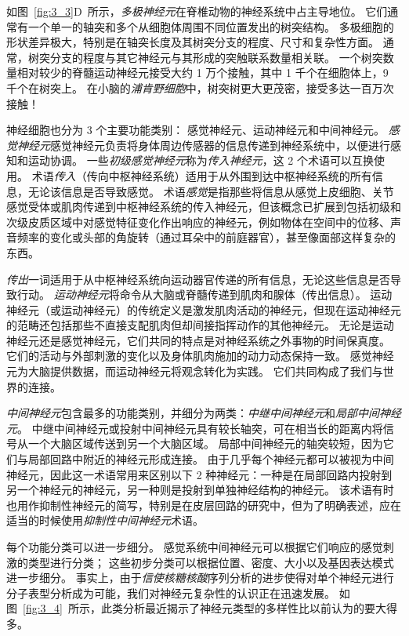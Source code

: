 如图~\ref{fig:3_3}D~所示，\textit{多极神经元}在脊椎动物的神经系统中占主导地位。 
它们通常有一个单一的轴突和多个从细胞体周围不同位置发出的树突结构。
多极细胞的形状差异极大，特别是在轴突长度及其树突分支的程度、尺寸和复杂性方面。 
通常，树突分支的程度与其它神经元与其形成的突触联系数量相关联。 
一个树突数量相对较少的脊髓运动神经元接受大约 1 万个接触，其中 1 千个在细胞体上，9 千个在树突上。
在小脑的\textit{浦肯野细胞}中，树突树更大更茂密，接受多达一百万次接触！


神经细胞也分为 3 个主要功能类别：
感觉神经元、运动神经元和中间神经元。 
\textit{感觉神经元}感觉神经元负责将身体周边传感器的信息传递到神经系统中，以便进行感知和运动协调。
一些\textit{初级感觉神经元}称为\textit{传入神经元}，这 2 个术语可以互换使用。
术语\textit{传入}（传向中枢神经系统）适用于从外围到达中枢神经系统的所有信息，无论该信息是否导致感觉。
术语\textit{感觉}是指那些将信息从感觉上皮细胞、关节感觉受体或肌肉传递到中枢神经系统的传入神经元，但该概念已扩展到包括初级和次级皮质区域中对感觉特征变化作出响应的神经元，例如物体在空间中的位移、声音频率的变化或头部的角旋转（通过耳朵中的前庭器官），甚至像面部这样复杂的东西。


\textit{传出}一词适用于从中枢神经系统向运动器官传递的所有信息，无论这些信息是否导致行动。
\textit{运动神经元}将命令从大脑或脊髓传递到肌肉和腺体（传出信息）。 
运动神经元（或运动神经元）的传统定义是激发肌肉活动的神经元，但现在运动神经元的范畴还包括那些不直接支配肌肉但却间接指挥动作的其他神经元。
无论是运动神经元还是感觉神经元，它们共同的特点是对神经系统之外事物的时间保真度。
它们的活动与外部刺激的变化以及身体肌肉施加的动力动态保持一致。	
感觉神经元为大脑提供数据，而运动神经元将观念转化为实践。 
它们共同构成了我们与世界的连接。


\textit{中间神经元}包含最多的功能类别，并细分为两类：\textit{中继中间神经元}和\textit{局部中间神经元}。
中继中间神经元或投射中间神经元具有较长轴突，可在相当长的距离内将信号从一个大脑区域传送到另一个大脑区域。
局部中间神经元的轴突较短，因为它们与局部回路中附近的神经元形成连接。
由于几乎每个神经元都可以被视为中间神经元，因此这一术语常用来区别以下 2 种神经元：一种是在局部回路内投射到另一个神经元的神经元，另一种则是投射到单独神经结构的神经元。
该术语有时也用作抑制性神经元的简写，特别是在皮层回路的研究中，但为了明确表述，应在适当的时候使用\textit{抑制性中间神经元}术语。


每个功能分类可以进一步细分。 
感觉系统中间神经元可以根据它们响应的感觉刺激的类型进行分类； 
这些初步分类可以根据位置、密度、大小以及基因表达模式进一步细分。
事实上，由于\textit{信使核糖核酸}序列分析的进步使得对单个神经元进行分子表型分析成为可能，我们对神经元复杂性的认识正在迅速发展。 
如图~\ref{fig:3_4}~所示，此类分析最近揭示了神经元类型的多样性比以前认为的要大得多。


